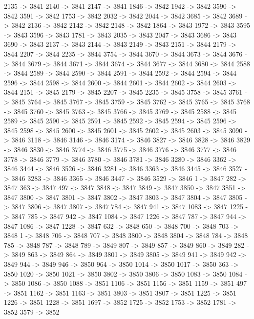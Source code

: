{	2135 -> 3841
	2140 -> 3841
	2147 -> 3841
	1846 -> 3842
	1942 -> 3842
	3590 -> 3842
	3591 -> 3842
	1753 -> 3842
	2032 -> 3842
	2044 -> 3842
	3685 -> 3842
	3689 -> 3842
	2136 -> 3842
	2142 -> 3842
	2148 -> 3842
	1864 -> 3843
	1972 -> 3843
	3595 -> 3843
	3596 -> 3843
	1781 -> 3843
	2035 -> 3843
	2047 -> 3843
	3686 -> 3843
	3690 -> 3843
	2137 -> 3843
	2144 -> 3843
	2149 -> 3843
	2151 -> 3844
	2179 -> 3844
	2207 -> 3844
	2235 -> 3844
	3754 -> 3844
	3670 -> 3844
	3673 -> 3844
	3676 -> 3844
	3679 -> 3844
	3671 -> 3844
	3674 -> 3844
	3677 -> 3844
	3680 -> 3844
	2588 -> 3844
	2589 -> 3844
	2590 -> 3844
	2591 -> 3844
	2592 -> 3844
	2594 -> 3844
	2596 -> 3844
	2598 -> 3844
	2600 -> 3844
	2601 -> 3844
	2602 -> 3844
	2603 -> 3844
	2151 -> 3845
	2179 -> 3845
	2207 -> 3845
	2235 -> 3845
	3758 -> 3845
	3761 -> 3845
	3764 -> 3845
	3767 -> 3845
	3759 -> 3845
	3762 -> 3845
	3765 -> 3845
	3768 -> 3845
	3760 -> 3845
	3763 -> 3845
	3766 -> 3845
	3769 -> 3845
	2588 -> 3845
	2589 -> 3845
	2590 -> 3845
	2591 -> 3845
	2592 -> 3845
	2594 -> 3845
	2596 -> 3845
	2598 -> 3845
	2600 -> 3845
	2601 -> 3845
	2602 -> 3845
	2603 -> 3845
	3090 -> 3846
	3118 -> 3846
	3146 -> 3846
	3174 -> 3846
	3827 -> 3846
	3828 -> 3846
	3829 -> 3846
	3830 -> 3846
	3774 -> 3846
	3775 -> 3846
	3776 -> 3846
	3777 -> 3846
	3778 -> 3846
	3779 -> 3846
	3780 -> 3846
	3781 -> 3846
	3280 -> 3846
	3362 -> 3846
	3444 -> 3846
	3526 -> 3846
	3281 -> 3846
	3363 -> 3846
	3445 -> 3846
	3527 -> 3846
	3283 -> 3846
	3365 -> 3846
	3447 -> 3846
	3529 -> 3846
	1 -> 3847
	282 -> 3847
	363 -> 3847
	497 -> 3847
	3848 -> 3847
	3849 -> 3847
	3850 -> 3847
	3851 -> 3847
	3800 -> 3847
	3801 -> 3847
	3802 -> 3847
	3803 -> 3847
	3804 -> 3847
	3805 -> 3847
	3806 -> 3847
	3807 -> 3847
	784 -> 3847
	941 -> 3847
	1083 -> 3847
	1225 -> 3847
	785 -> 3847
	942 -> 3847
	1084 -> 3847
	1226 -> 3847
	787 -> 3847
	944 -> 3847
	1086 -> 3847
	1228 -> 3847
	632 -> 3848
	650 -> 3848
	700 -> 3848
	703 -> 3848
	1 -> 3848
	706 -> 3848
	707 -> 3848
	3800 -> 3848
	3804 -> 3848
	784 -> 3848
	785 -> 3848
	787 -> 3848
	789 -> 3849
	807 -> 3849
	857 -> 3849
	860 -> 3849
	282 -> 3849
	863 -> 3849
	864 -> 3849
	3801 -> 3849
	3805 -> 3849
	941 -> 3849
	942 -> 3849
	944 -> 3849
	946 -> 3850
	964 -> 3850
	1014 -> 3850
	1017 -> 3850
	363 -> 3850
	1020 -> 3850
	1021 -> 3850
	3802 -> 3850
	3806 -> 3850
	1083 -> 3850
	1084 -> 3850
	1086 -> 3850
	1088 -> 3851
	1106 -> 3851
	1156 -> 3851
	1159 -> 3851
	497 -> 3851
	1162 -> 3851
	1163 -> 3851
	3803 -> 3851
	3807 -> 3851
	1225 -> 3851
	1226 -> 3851
	1228 -> 3851
	1697 -> 3852
	1725 -> 3852
	1753 -> 3852
	1781 -> 3852
	3579 -> 3852
}
